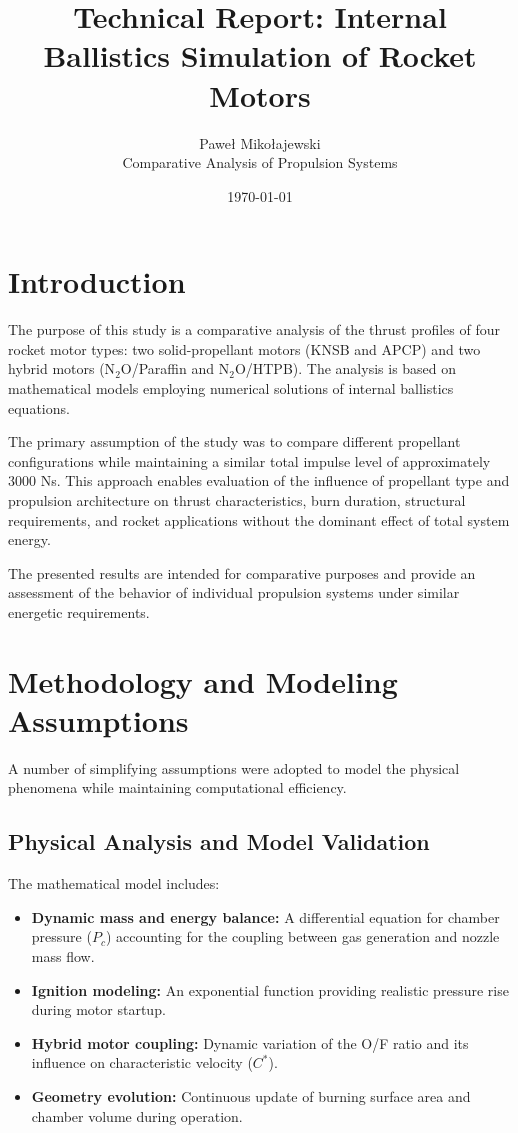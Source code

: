 \documentclass[a4paper,12pt]{article}
\title{\textbf{Technical Report: Internal Ballistics Simulation of Rocket Motors}}
\author{Paweł Mikołajewski\\Comparative Analysis of Propulsion Systems}
\date{\today}
\begin{document}
\maketitle
\newpage

\tableofcontents
\newpage

\section{Introduction}

The purpose of this study is a comparative analysis of the thrust profiles of four rocket motor types: two solid-propellant motors (KNSB and APCP) and two hybrid motors (N$_2$O/Paraffin and N$_2$O/HTPB). The analysis is based on mathematical models employing numerical solutions of internal ballistics equations.

The primary assumption of the study was to compare different propellant configurations while maintaining a similar total impulse level of approximately 3000 Ns. This approach enables evaluation of the influence of propellant type and propulsion architecture on thrust characteristics, burn duration, structural requirements, and rocket applications without the dominant effect of total system energy.

The presented results are intended for comparative purposes and provide an assessment of the behavior of individual propulsion systems under similar energetic requirements.

\section{Methodology and Modeling Assumptions}

A number of simplifying assumptions were adopted to model the physical phenomena while maintaining computational efficiency.

\subsection{Physical Analysis and Model Validation}

The mathematical model includes:

\begin{itemize}

    \item \textbf{Dynamic mass and energy balance:} A differential equation for chamber pressure ($P_c$) accounting for the coupling between gas generation and nozzle mass flow.

    \item \textbf{Ignition modeling:} An exponential function providing realistic pressure rise during motor startup.

    \item \textbf{Hybrid motor coupling:} Dynamic variation of the O/F ratio and its influence on characteristic velocity ($C^*$).

    \item \textbf{Geometry evolution:} Continuous update of burning surface area and chamber volume during operation.

\end{itemize}
\end{document}
